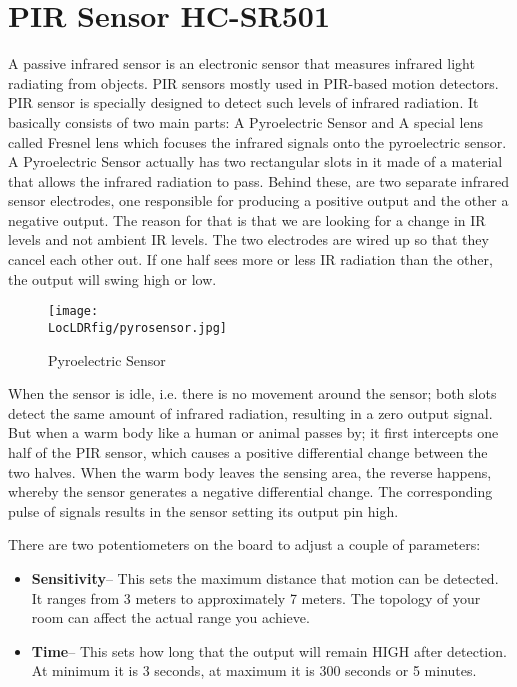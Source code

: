 \section{PIR Sensor HC-SR501}
A passive infrared sensor is an electronic sensor that measures infrared light radiating from objects. PIR sensors mostly used in PIR-based motion detectors.
PIR sensor is specially designed to detect such levels of infrared radiation. It basically consists of two main parts: A Pyroelectric Sensor and A special lens called Fresnel lens which focuses the infrared signals onto the pyroelectric sensor.
A Pyroelectric Sensor actually has two rectangular slots in it made of a material that allows the infrared radiation to pass. Behind these, are two separate infrared sensor electrodes, one responsible for producing a positive output and the other a negative output. The reason for that is that we are looking for a change in IR levels and not ambient IR levels. The two electrodes are wired up so that they cancel each other out. If one half sees more or less IR radiation than the other, the output will swing high or low.


\begin{figure}[hpt]
  \centering
    \texttt{[image: \\LocLDRfig/pyrosensor.jpg]}
    \label{fig:pyro} \hfill
  \caption{Pyroelectric Sensor}
\end{figure}


When the sensor is idle, i.e. there is no movement around the sensor; both slots detect the same amount of infrared radiation, resulting in a zero output signal.
But when a warm body like a human or animal passes by; it first intercepts one half of the PIR sensor, which causes a positive differential change between the two halves. When the warm body leaves the sensing area, the reverse happens, whereby the sensor generates a negative differential change. The corresponding pulse of signals results in the sensor setting its output pin high.

There are two potentiometers on the board to adjust a couple of parameters:
\begin{itemize}
  \item \textbf{Sensitivity}– This sets the maximum distance that motion can be detected. It ranges from 3 meters to approximately 7 meters. The topology of your room can affect the actual range you achieve.
  \item \textbf{Time}– This sets how long that the output will remain HIGH after detection. At minimum it is 3 seconds, at maximum it is 300 seconds or 5 minutes.
\end{itemize}
 
